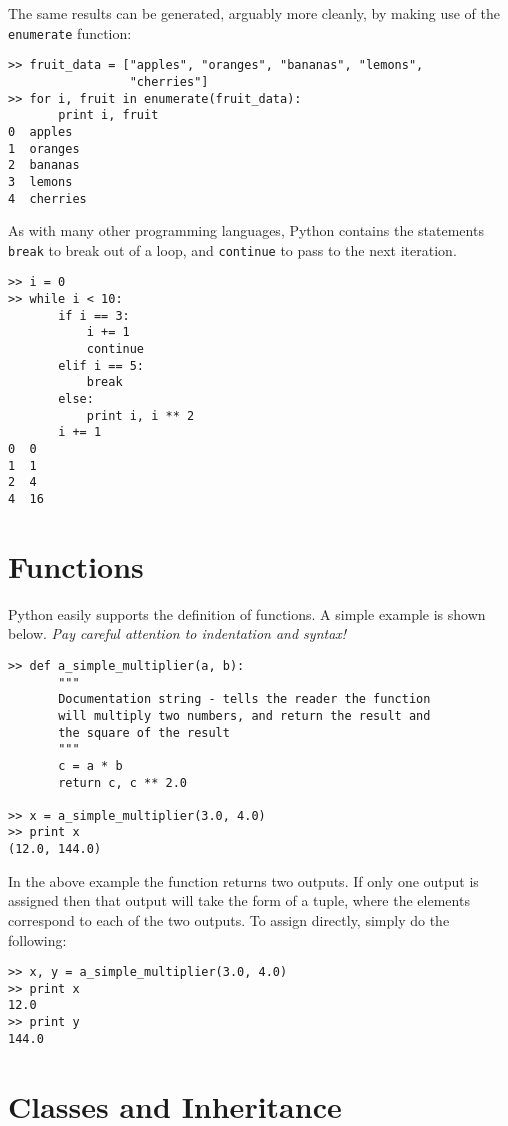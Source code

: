 The same results can be generated, arguably more cleanly, by making use of the \verb=enumerate= function:

\begin{lstlisting}[frame=single]
>> fruit_data = ["apples", "oranges", "bananas", "lemons", 
                 "cherries"]
>> for i, fruit in enumerate(fruit_data):
       print i, fruit
0  apples
1  oranges
2  bananas
3  lemons
4  cherries 
\end{lstlisting}

As with many other programming languages, Python contains the statements \verb=break= to break out of a loop, and \verb=continue= to pass to the next iteration.

\begin{lstlisting}[frame=single]
>> i = 0
>> while i < 10:
       if i == 3:
           i += 1
           continue
       elif i == 5:
           break
       else:
           print i, i ** 2
       i += 1
0  0
1  1
2  4
4  16
\end{lstlisting}

\section{Functions}

Python easily supports the definition of functions. A simple example is shown below. \emph{Pay careful attention to indentation and syntax!}

\begin{lstlisting}[frame=single]
>> def a_simple_multiplier(a, b):
       """
       Documentation string - tells the reader the function 
       will multiply two numbers, and return the result and
       the square of the result
       """
       c = a * b
       return c, c ** 2.0

>> x = a_simple_multiplier(3.0, 4.0)
>> print x
(12.0, 144.0)
\end{lstlisting}

In the above example the function returns two outputs. If only one output is assigned then that output will take the form of a tuple, where the elements correspond to each of the two outputs. To assign directly, simply do the following:

\begin{lstlisting}[frame=single]
>> x, y = a_simple_multiplier(3.0, 4.0)
>> print x
12.0
>> print y
144.0
\end{lstlisting}

\section{Classes and Inheritance}

